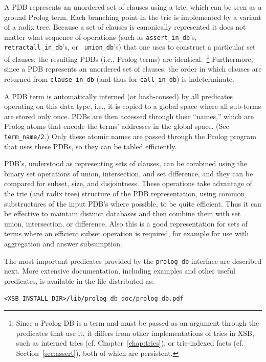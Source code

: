A PDB represents an unordered set of clauses using a trie, which can
be seen as a ground Prolog term.  Each branching point in the trie is
implemented by a variant of a radix tree.  Because a set of clauses is
canonically represented it does not matter what sequence of operations
(such as {\tt assert\_in\_db}'s, {\tt retractall\_in\_db}'s, or {\tt
  union\_db}'s) that one uses to construct a particular set of
clauses: the resulting PDBs (i.e., Prolog terms) are
identical.~\footnote{Since a Prolog DB is a term and must be passed as
  an argument through the predicates that use it, it differs from
  other implementations of tries in XSB, such as interned tries
  (cf. Chapter~\ref{chap:tries}), or trie-indexed facts
  (cf. Section~\ref{sec:assert}), both of which are persistent.}
Furthermore, since a PDB represents an unordered set of clauses, the
order in which clauses are returned from {\tt clause\_in\_db} (and
thus for {\tt call\_in\_db}) is indeterminate.


A PDB term is automatically interned (or hash-consed) by all
predicates operating on this data type, i.e., it is copied to a global
space where all sub-terms are stored only once.  PDBs are then
accessed through their ``names,'' which are Prolog atoms that encode
the terms' addresses in the global space.  (See {\tt term\_name/2}.)
Only these atomic names are passed through the Prolog program that
uses these PDBs, so they can be tabled efficiently.

PDB's, understood as representing sets of clauses, can be combined
using the binary set operations of union, intersection, and set
difference, and they can be compared for subset, size, and
disjointness.  These operations take advantage of the trie (and radix
tree) structure of the PDB representation, using common substructures
of the input PDB's where possible, to be quite efficient.  Thus it can
be effective to maintain distinct databases and then combine them with
set union, intersection, or difference.  Also this is a good
representation for sets of terms where an efficient subset operation is
required, for example for use with aggregation and answer subsumption.

The most important predicates provided by the {\tt prolog\_db}
interface are described next.  More extensive documentation, including
examples and other useful predicates, is available in the file
distributed as:

{\tt <XSB\_INSTALL\_DIR>/lib/prolog\_db\_doc/prolog\_db.pdf}

